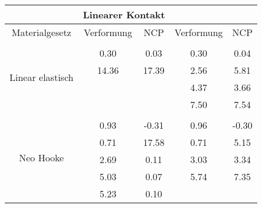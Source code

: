\begin{table} 
\centering 
\begin{tabular}{c|cc|cc|} 
\cline{2-5} 
 & \multicolumn{2}{|c|}{Linearer Kontakt} &  \\ 
\hline 
\multicolumn{1}{|c|}{Materialgesetz} & \multicolumn{1}{c|}{Verformung} & \multicolumn{1}{c|}{NCP} & \multicolumn{1}{c|}{Verformung} & \multicolumn{1}{c|}{NCP} \\ 
\hline 
\multicolumn{1}{|c|}{\multirow{5}{*}{Linear elastisch}} &\multicolumn{1}{|c|}{} & \multicolumn{1}{|c|}{} & \multicolumn{1}{|c|}{} & \multicolumn{1}{|c|}{} \\ 
\multicolumn{1}{|c|}{} & \multicolumn{1}{|c|}{      0.30} & \multicolumn{1}{|c|}{      0.03} & \multicolumn{1}{|c|}{      0.30} & \multicolumn{1}{|c|}{      0.04} \\ 
\multicolumn{1}{|c|}{} & \multicolumn{1}{|c|}{     14.36} & \multicolumn{1}{|c|}{     17.39} & \multicolumn{1}{|c|}{      2.56} & \multicolumn{1}{|c|}{      5.81} \\ 
\multicolumn{1}{|c|}{} & \multicolumn{1}{|c|}{} & \multicolumn{1}{|c|}{} & \multicolumn{1}{|c|}{      4.37} & \multicolumn{1}{|c|}{      3.66} \\ 
\multicolumn{1}{|c|}{} & \multicolumn{1}{|c|}{} & \multicolumn{1}{|c|}{} & \multicolumn{1}{|c|}{      7.50} & \multicolumn{1}{|c|}{      7.54} \\ 
\hline 
\multicolumn{1}{|c|}{\multirow{6}{*}{Neo Hooke}} &\multicolumn{1}{|c|}{} & \multicolumn{1}{|c|}{} & \multicolumn{1}{|c|}{} & \multicolumn{1}{|c|}{} \\ 
\multicolumn{1}{|c|}{} & \multicolumn{1}{|c|}{      0.93} & \multicolumn{1}{|c|}{     -0.31} & \multicolumn{1}{|c|}{      0.96} & \multicolumn{1}{|c|}{     -0.30} \\ 
\multicolumn{1}{|c|}{} & \multicolumn{1}{|c|}{      0.71} & \multicolumn{1}{|c|}{     17.58} & \multicolumn{1}{|c|}{      0.71} & \multicolumn{1}{|c|}{      5.15} \\ 
\multicolumn{1}{|c|}{} & \multicolumn{1}{|c|}{      2.69} & \multicolumn{1}{|c|}{      0.11} & \multicolumn{1}{|c|}{      3.03} & \multicolumn{1}{|c|}{      3.34} \\ 
\multicolumn{1}{|c|}{} & \multicolumn{1}{|c|}{      5.03} & \multicolumn{1}{|c|}{      0.07} & \multicolumn{1}{|c|}{      5.74} & \multicolumn{1}{|c|}{      7.35} \\ 
\multicolumn{1}{|c|}{} & \multicolumn{1}{|c|}{      5.23} & \multicolumn{1}{|c|}{      0.10} & \multicolumn{1}{|c|}{} & \multicolumn{1}{|c|}{} \\ 

\end{tabular}
\end{table}
